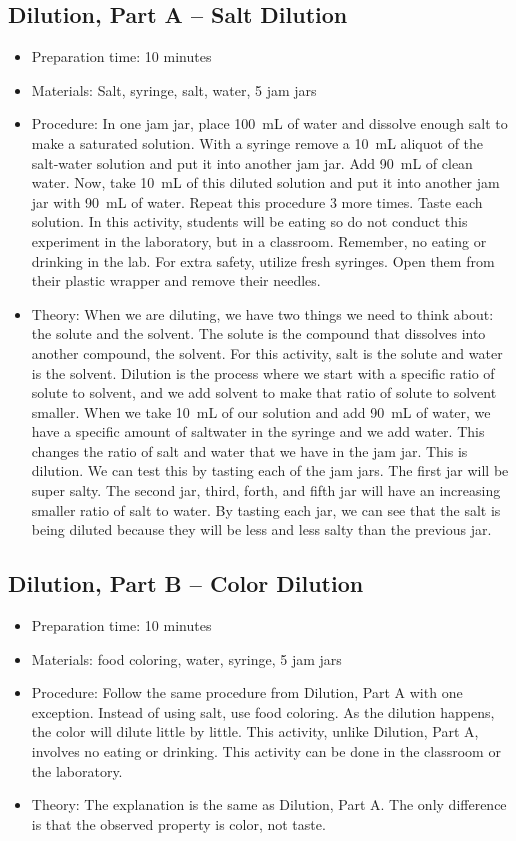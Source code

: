 \subsection{Dilution, Part A -- Salt Dilution}
\begin{itemize}
\item{Preparation time: 10 minutes}
\item{Materials: Salt, syringe, salt, water, 5 jam jars}
\item{Procedure: In one jam jar, place 100~mL of water and dissolve enough salt to make a saturated solution. With a syringe remove a 10~mL aliquot of the salt-water solution and put it into another jam jar. Add 90~mL of clean water. Now, take 10~mL of this diluted solution and put it into another jam jar with 90~mL of water. Repeat this procedure 3 more times. Taste each solution. In this activity, students will be eating so do not conduct this experiment in the laboratory, but in a classroom. Remember, no eating or drinking in the lab. For extra safety, utilize fresh syringes. Open them from their plastic wrapper and remove their needles.}
\item{Theory: When we are diluting, we have two things we need to think about: the solute and the solvent. The solute is the compound that dissolves into another compound, the solvent. For this activity, salt is the solute and water is the solvent. Dilution is the process where we start with a specific ratio of solute to solvent, and we add solvent to make that ratio of solute to solvent smaller. When we take 10~mL of our solution and add 90~mL of water, we have a specific amount of saltwater in the syringe and we add water. This changes the ratio of salt and water that we have in the jam jar. This is dilution. We can test this by tasting each of the jam jars. The first jar will be super salty. The second jar, third, forth, and fifth jar will have an increasing smaller ratio of salt to water. By tasting each jar, we can see that the salt is being diluted because they will be less and less salty than the previous jar.}
\end{itemize}

\subsection{Dilution, Part B -- Color Dilution}
\begin{itemize}
\item{Preparation time: 10 minutes}
\item{Materials: food coloring, water, syringe, 5 jam jars}
\item{Procedure: Follow the same procedure from Dilution, Part A with one exception. Instead of using salt, use food coloring. As the dilution happens, the color will dilute little by little. This activity, unlike Dilution, Part A, involves no eating or drinking. This activity can be done in the classroom or the laboratory.}
\item{Theory: The explanation is the same as Dilution, Part A. The only difference is that the observed property is color, not taste.}
\end{itemize}

